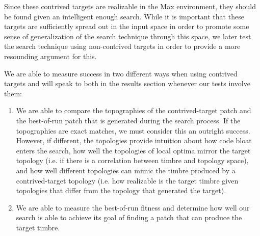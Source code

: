 \documentclass[12pt]{report} 	%
\numberwithin{figure}{chapter}
\numberwithin{table}{chapter}
\numberwithin{equation}{chapter}
\begin{document}
\begin{flushleft}
Since these contrived targets are realizable in the Max environment, they should be found given an intelligent enough search. While it is important that these targets are sufficiently spread out in the input space in order to promote some sense of generalization of the search technique through this space, we later test the search technique using non-contrived targets in order to provide a more resounding argument for this.

We are able to measure success in two different ways when using contrived targets and will speak to both in the results section whenever our tests involve them:
\begin{enumerate}
\item We are able to compare the topographies of the contrived-target patch and the best-of-run patch that is generated during the search process. If the topographies are exact matches, we must consider this an outright success. However, if different, the topologies provide intuition about how code bloat enters the search, how well the topologies of local optima mirror the target topology (i.e. if there is a correlation between timbre and topology space), and how well different topologies can mimic the timbre produced by a contrived-target topology (i.e. how realizable is the target timbre given topologies that differ from the topology that generated the target).
\item We are able to measure the best-of-run fitness and determine how well our search is able to achieve its goal of finding a patch that can produce the target timbre.
\end{enumerate}


\end{flushleft}
\end{document}
